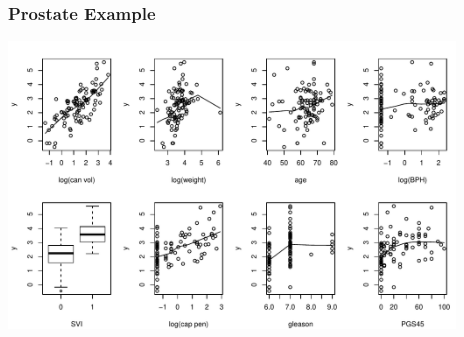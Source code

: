 \documentclass[]{beamer}
\begin{document}
\begin{frame}
  \frametitle{Prostate Example}
 \includegraphics[height=3in]{prostfig1.pdf} 
\end{frame}
\end{document}
